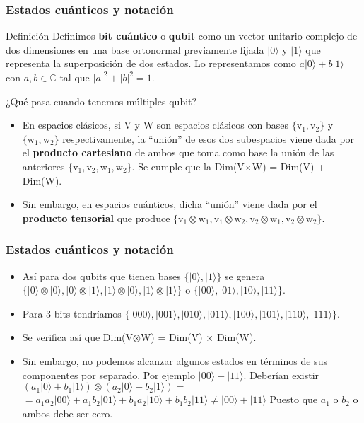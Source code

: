 \documentclass{beamer}
\newcommand{\base}[1]{|#1\rangle}
\newcommand{\complex}{\mathbb{C}}
\begin{document}
\begin{frame}
	\frametitle{Estados cuánticos y notación}
	\begin{block}{Definición}
	Definimos \textbf{bit cuántico} o \textbf{qubit} como un vector unitario complejo de dos dimensiones en una base ortonormal previamente fijada $\base 0$ y $\base 1$ que representa la  superposición de dos estados. Lo representamos como $a\base0+b\base1$ con $a,b\in\complex$ tal que $|a|^2+|b|^2=1$.
	\end{block}
	¿Qué pasa cuando tenemos múltiples qubit?
	\begin{itemize}
	\item En espacios clásicos, si V y W son espacios clásicos con bases $\{\mathrm{v}_1,\mathrm{v}_2\}$ y $\{\mathrm{w}_1,\mathrm{w}_2\}$ respectivamente, la ``unión'' de esos dos subespacios viene dada por el \textbf{producto cartesiano} de ambos que toma como base la unión de las anteriores $\{\mathrm{v}_1,\mathrm{v}_2,\mathrm{w}_1,\mathrm{w}_2\}$. Se cumple que la Dim(V$\times$W) = Dim(V) + Dim(W).
	\item Sin embargo, en espacios cuánticos, dicha ``unión'' viene dada por el \textbf{producto tensorial} que produce $\{\mathrm{v}_1\otimes\mathrm{w}_1,\mathrm{v}_1\otimes\mathrm{w}_2, \mathrm{v}_2\otimes\mathrm{w}_1,\mathrm{v}_2\otimes\mathrm{w}_2\}$.
	\end{itemize}
\end{frame}


\begin{frame}
	\frametitle{Estados cuánticos y notación}
	\begin{itemize}
	\item Así para dos qubits que tienen bases $\{\base0,\base1\}$ se genera $\{\base0\otimes\base0, \base0\otimes\base1, \base1\otimes\base0,\base1\otimes\base1\}$ o $\{\base{00},\base{01},\base{10},\base{11}\}$.
	\item Para 3 bits tendríamos $\{\base{000},\base{001},\base{010},\base{011},\base{100},\base{101},\base{110},\base{111}\}$.
	\item Se verifica así que Dim(V$\otimes$W) = Dim(V) $\times$ Dim(W).
	\item Sin embargo, no podemos alcanzar algunos estados en términos de sus componentes por separado. Por ejemplo $\base{00}+\base{11}$. Deberían existir $(a_1\base0+b_1\base1)\otimes(a_2\base0+b_2\base1)=$ $=a_1a_2\base{00}+a_1b_2\base{01}+b_1a_2\base{10}+b_1b_2\base{11}\neq\base{00}+\base{11}$ Puesto que $a_1$ o $b_2$ o ambos debe ser cero. 
	\end{itemize}
\end{frame}
\end{document}
